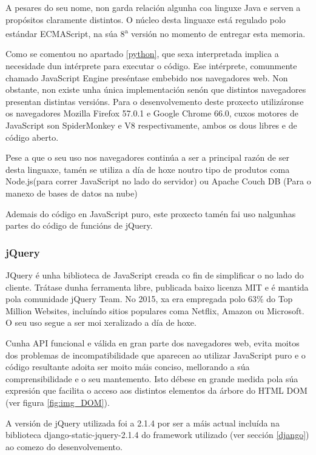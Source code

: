 A pesares do seu nome, non garda relación algunha coa linguxe Java e serven a propósitos claramente distintos. O núcleo desta linguaxe está regulado polo estándar ECMAScript\textregistered, na súa 8\textsuperscript{a} versión\cite{ecma} no momento de entregar esta memoria. 

Como se comentou no apartado \ref{python}, que sexa interpretada implica a necesidade dun intérprete para executar o código. Ese intérprete, comunmente chamado JavaScript Engine preséntase embebido nos navegadores web. Non obstante, non existe unha única implementación senón que distintos navegadores presentan distintas versións. Para o desenvolvemento deste proxecto utilizáronse os navegadores Mozilla Firefox 57.0.1 e Google Chrome 66.0, cuxos motores de JavaScript son SpiderMonkey e V8 respectivamente\cite{javascript1}, ambos os dous libres e de código aberto.

Pese a que o seu uso nos navegadores continúa a ser a principal razón de ser desta linguaxe, tamén se utiliza a día de hoxe noutro tipo de produtos coma Node.js(para correr JavaScript no lado do servidor) ou Apache Couch DB (Para o manexo de bases de datos na nube)\cite{javascript2} 

Ademais do código en JavaScript puro, este proxecto tamén fai uso nalgunhas partes do código de funcións de jQuery.

\subsubsection{jQuery}
\label{jquery}
JQuery é unha biblioteca de JavaScript creada co fin de simplificar o  no lado do cliente. Trátase dunha ferramenta libre, publicada baixo licenza MIT e é mantida pola comunidade jQuery Team. No 2015, xa era empregada polo 63\% do Top Million Websites\cite{jquery}, incluíndo sitios populares coma Netflix, Amazon ou Microsoft. O seu uso segue a ser moi xeralizado a día de hoxe.  

Cunha API funcional e válida en gran parte dos navegadores web, evita moitos dos problemas de incompatibilidade que aparecen ao utilizar JavaScript puro e o código resultante adoita ser moito máis conciso, mellorando a súa comprensibilidade e o seu mantemento. Isto débese en grande medida pola súa expresión  que facilita o acceso aos distintos elementos da árbore do HTML DOM (ver figura \ref{fig:img_DOM}). 

A versión de jQuery utilizada foi a 2.1.4 por ser a máis actual incluída na biblioteca django-static-jquery-2.1.4\cite{dj-jquery} do framework utilizado (ver sección \ref{django}) ao comezo do desenvolvemento.



